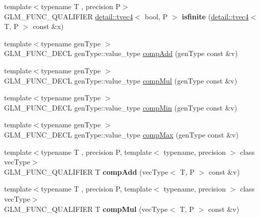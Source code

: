 \begin{DoxyCompactItemize}
\item 
{\footnotesize template$<$typename T , precision P$>$ }\\G\+L\+M\+\_\+\+F\+U\+N\+C\+\_\+\+Q\+U\+A\+L\+I\+F\+I\+ER \hyperlink{structglm_1_1detail_1_1tvec4}{detail\+::tvec4}$<$ bool, P $>$ {\bfseries isfinite} (\hyperlink{structglm_1_1detail_1_1tvec4}{detail\+::tvec4}$<$ T, P $>$ const \&x)\hypertarget{namespaceglm_a3b82228dc5d102145c0f48bac41643ea}{}\label{namespaceglm_a3b82228dc5d102145c0f48bac41643ea}

\item 
{\footnotesize template$<$typename gen\+Type $>$ }\\G\+L\+M\+\_\+\+F\+U\+N\+C\+\_\+\+D\+E\+CL gen\+Type\+::value\+\_\+type \hyperlink{group__gtx__component__wise_gaf71833350e15e74d31cbf8a3e7f27051}{comp\+Add} (gen\+Type const \&v)
\item 
{\footnotesize template$<$typename gen\+Type $>$ }\\G\+L\+M\+\_\+\+F\+U\+N\+C\+\_\+\+D\+E\+CL gen\+Type\+::value\+\_\+type \hyperlink{group__gtx__component__wise_gae8ab88024197202c9479d33bdc5a8a5d}{comp\+Mul} (gen\+Type const \&v)
\item 
{\footnotesize template$<$typename gen\+Type $>$ }\\G\+L\+M\+\_\+\+F\+U\+N\+C\+\_\+\+D\+E\+CL gen\+Type\+::value\+\_\+type \hyperlink{group__gtx__component__wise_gab5d0832b5c7bb01b8d7395973bfb1425}{comp\+Min} (gen\+Type const \&v)
\item 
{\footnotesize template$<$typename gen\+Type $>$ }\\G\+L\+M\+\_\+\+F\+U\+N\+C\+\_\+\+D\+E\+CL gen\+Type\+::value\+\_\+type \hyperlink{group__gtx__component__wise_gabfa4bb19298c8c73d4217ba759c496b6}{comp\+Max} (gen\+Type const \&v)
\item 
{\footnotesize template$<$typename T , precision P, template$<$ typename, precision $>$ class vec\+Type$>$ }\\G\+L\+M\+\_\+\+F\+U\+N\+C\+\_\+\+Q\+U\+A\+L\+I\+F\+I\+ER T {\bfseries comp\+Add} (vec\+Type$<$ T, P $>$ const \&v)\hypertarget{namespaceglm_a766b58e13ddfe3140ce22939887aa954}{}\label{namespaceglm_a766b58e13ddfe3140ce22939887aa954}

\item 
{\footnotesize template$<$typename T , precision P, template$<$ typename, precision $>$ class vec\+Type$>$ }\\G\+L\+M\+\_\+\+F\+U\+N\+C\+\_\+\+Q\+U\+A\+L\+I\+F\+I\+ER T {\bfseries comp\+Mul} (vec\+Type$<$ T, P $>$ const \&v)\hypertarget{namespaceglm_a2b7811672b3a9afce8913dae19548b30}{}\label{namespaceglm_a2b7811672b3a9afce8913dae19548b30}


\end{DoxyCompactItemize}

